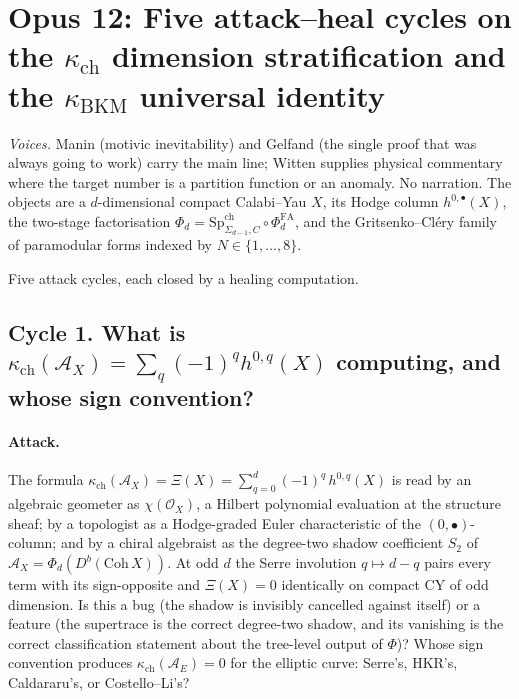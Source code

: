 \section*{Opus 12: Five attack--heal cycles on
  the \texorpdfstring{$\kappa_{\mathrm{ch}}$}{kappa-ch} dimension
  stratification and the \texorpdfstring{$\kappa_{\mathrm{BKM}}$}{kappa-BKM}
  universal identity}
\label{sec:opus12-kappa-stratification}

\emph{Voices.} Manin (motivic inevitability) and Gelfand (the single
proof that was always going to work) carry the main line; Witten
supplies physical commentary where the target number is a partition
function or an anomaly. No narration. The objects are a
$d$-dimensional compact Calabi--Yau $X$, its Hodge column
$h^{0, \bullet}(X)$, the two-stage factorisation
$\Phi_d = \mathrm{Sp}^{\mathrm{ch}}_{\Sigma_{d-1}, C} \circ
\Phi^{\mathrm{FA}}_d$, and the Gritsenko--Cl\'ery family of paramodular
forms indexed by $N \in \{1, \ldots, 8\}$.

Five attack cycles, each closed by a healing computation.

\subsection*{Cycle 1. What is $\kappa_{\mathrm{ch}}(\mathcal{A}_X) =
  \sum_q (-1)^q h^{0, q}(X)$ computing, and whose sign convention?}

\paragraph{Attack.} The formula
\(
  \kappa_{\mathrm{ch}}(\mathcal{A}_X) = \Xi(X)
  = \sum_{q = 0}^{d} (-1)^q\, h^{0, q}(X)
\)
is read by an algebraic geometer as
$\chi(\mathcal{O}_X)$, a Hilbert polynomial evaluation at the
structure sheaf; by a topologist as a Hodge-graded Euler
characteristic of the $(0, \bullet)$-column; and by a chiral
algebraist as the degree-two shadow coefficient $S_2$ of
$\mathcal{A}_X = \Phi_d(D^b(\mathrm{Coh}\, X))$. At odd $d$ the
Serre involution $q \mapsto d - q$ pairs every term with its
sign-opposite and $\Xi(X) = 0$ identically on compact CY of odd
dimension. Is this a bug (the shadow is invisibly cancelled against
itself) or a feature (the supertrace is the correct degree-two shadow,
and its vanishing is the correct classification statement about the
tree-level output of $\Phi$)? Whose sign convention produces
$\kappa_{\mathrm{ch}}(\mathcal{A}_E) = 0$ for the elliptic curve:
Serre's, HKR's, Caldararu's, or Costello--Li's?

